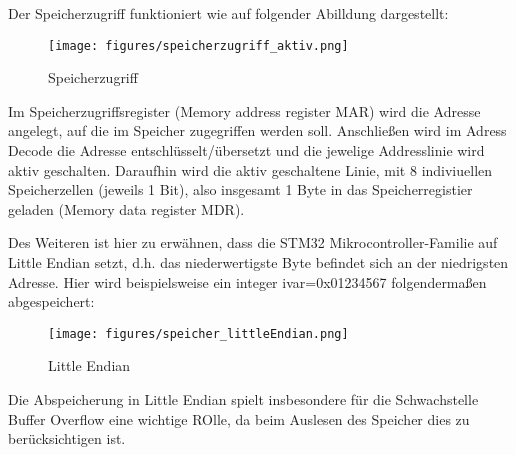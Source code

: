 \documentclass[a4paper,
DIV=13,
12pt,
BCOR=10mm,
department=FakIM,
oneside,
parskip=half,
automark,
listof=totocnumbered,
bibliography=totocnumbered,
acronym=totocnumbered
] {OTHRartcl}
\newcommand{\comment}[1]{}
\begin{document}

Der Speicherzugriff funktioniert wie auf folgender Abilldung dargestellt:

\begin{figure}[ht!]
    \begin{center}
      \texttt{[image: figures/speicherzugriff\_aktiv.png]}
      \caption{Speicherzugriff}
      \label{Abbildung 1: Speicherzugriff}
    \end{center}
  \end{figure}

Im Speicherzugriffsregister (Memory address register MAR) wird die Adresse angelegt, auf die im Speicher zugegriffen werden soll.
Anschließen wird im Adress Decode die Adresse entschlüsselt/übersetzt und die jewelige Addresslinie wird aktiv geschalten.
Daraufhin wird die aktiv geschaltene Linie, mit 8 indiviuellen Speicherzellen (jeweils 1 Bit), also insgesamt 1 Byte in
das Speicherregistier geladen (Memory data register MDR).

Des Weiteren ist hier zu erwähnen, dass die STM32 Mikrocontroller-Familie auf Little Endian setzt, d.h. das niederwertigste Byte befindet sich an der niedrigsten Adresse.
Hier wird beispielsweise ein integer ivar=0x01234567 folgendermaßen abgespeichert:

\begin{figure}[ht!]
    \begin{center}
      \texttt{[image: figures/speicher\_littleEndian.png]}
      \caption{Little Endian}
      \label{Abbildung 1: Little Endian}
    \end{center}
\end{figure}

Die Abspeicherung in Little Endian spielt insbesondere für die Schwachstelle Buffer Overflow eine wichtige ROlle, da beim Auslesen des
Speicher dies zu berücksichtigen ist.

\comment{
intern Harvard-Architektur, aber aus Programmierersicht von-Neumann-Architektur
linearer Adressraum für Programme und Daten
Sprungvorhersage
Multiplikation in einem Takt
Thumb2-Befehlsatz, der gegenüber dem Thumb-Befehlssatz 30%
optimiert für Compilerprogrammierung
einfaches Programmiermodell, keine Kenntnisse über den Prozessorkern notwendig
hardwarebasierter Interrupt
beim Interrupt werden die Register automatisch gesichert
Memory-Protection
Timer
umfangreiche Peripherie (typabhängig)
Debug und Tracemöglichkeiten in den Prozessor integriert
geringer Stromverbrauch
}
\end{document}
